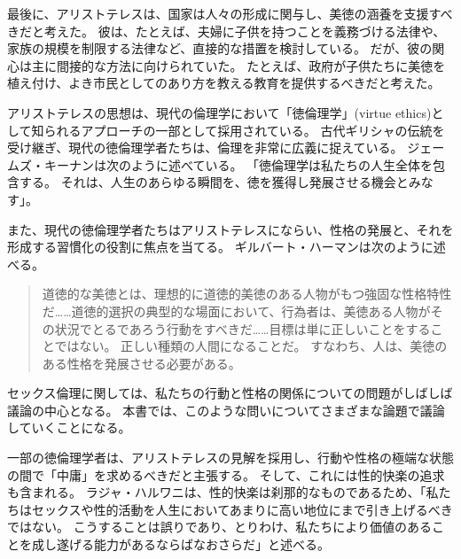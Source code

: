 \documentclass[paper=a4,book,openany]{jlreq}
\begin{document}
最後に、アリストテレスは、国家は人々の形成に関与し、美徳の涵養を支援すべきだと考えた。
彼は、たとえば、夫婦に子供を持つことを義務づける法律や、家族の規模を制限する法律など、直接的な措置を検討している。
だが、彼の関心は主に間接的な方法に向けられていた。
たとえば、政府が子供たちに美徳を植え付け、よき市民としてのあり方を教える教育を提供するべきだと考えた。

アリストテレスの思想は、現代の倫理学において「徳倫理学」(virtue ethics)として知られるアプローチの一部として採用されている。
古代ギリシャの伝統を受け継ぎ、現代の徳倫理学者たちは、倫理を非常に広義に捉えている。
ジェームズ・キーナンは次のように述べている。
「徳倫理学は私たちの人生全体を包含する。
それは、人生のあらゆる瞬間を、徳を獲得し発展させる機会とみなす」\citep[p.185]{keenan05:_virtue}。

また、現代の徳倫理学者たちはアリストテレスにならい、性格の発展と、それを形成する習慣化の役割に焦点を当てる。
ギルバート・ハーマンは次のように述べる。

\begin{quote}
  道徳的な美徳とは、理想的に道徳的美徳のある人物がもつ強固な性格特性だ……道徳的選択の典型的な場面において、行為者は、美徳ある人物がその状況でとるであろう行動をすべきだ……目標は単に正しいことをすることではない。
正しい種類の人間になることだ。
すなわち、人は、美徳のある性格を発展させる必要がある。
\citep[][pp.119-120]{harman99:_virtue_ethic_charac_trait}
\end{quote}

セックス倫理に関しては、私たちの行動と性格の関係についての問題がしばしば議論の中心となる。
本書では、このような問いについてさまざまな論題で議論していくことになる。

一部の徳倫理学者は、アリストテレスの見解を採用し、行動や性格の極端な状態の間で「中庸」を求めるべきだと主張する。
そして、これには性的快楽の追求も含まれる。
ラジャ・ハルワニは、性的快楽は刹那的なものであるため、「私たちはセックスや性的活動を人生においてあまりに高い地位にまで引き上げるべきではない。
こうすることは誤りであり、とりわけ、私たちにより価値のあることを成し遂げる能力があるならばなおさらだ」と述べる\citep[p.183]{halwani10:_philos_love_sex_marriag}。
\end{document}
